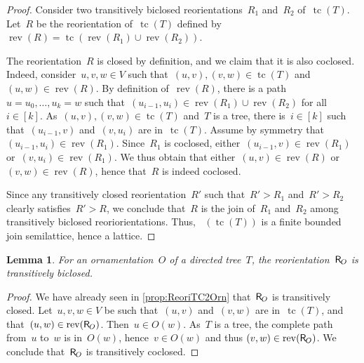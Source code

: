 \documentclass{amsart}
\newtheorem{lemma}[theorem]{Lemma}
\theoremstyle{definition}
\renewcommand{\c}[1]{\mathcal{#1}} %
\DeclareMathOperator{\tc}{tc} %
\newcommand{\mymap}[2]{\mathsf{#1}_{\hspace{-.7pt}#2}}
\newcommand{\reori}[1]{\mymap{R}{#1}}  %
\DeclareMathOperator{\Rbi}{\c{R}^{bi}}  %
\DeclareMathOperator{\rev}{rev} %
\begin{document}
\begin{proof}
Consider two transitively biclosed reorientations~$R_1$ and~$R_2$ of~$\tc(T)$.
Let~$R$ be the reorientation of~$\tc(T)$ defined by~$\rev(R) = \tc(\rev(R_1) \cup \rev(R_2))$.

The reorientation~$R$ is closed by definition, and we claim that it is also coclosed.
Indeed, consider~$u,v,w \in V$ such that~$(u,v), (v,w) \in \tc(T)$ and~$(u,w) \in \rev(R)$.
By definition of~$\rev(R)$, there is a path~$u = u_0, \dots, u_k = w$ such that~$(u_{i-1}, u_i) \in \rev(R_1) \cup \rev(R_2)$ for all~$i \in [k]$.
As~$(u,v), (v,w) \in \tc(T)$ and~$T$ is a tree, there is~$i \in [k]$ such that~$(u_{i-1}, v)$ and~$(v, u_i)$ are in~$\tc(T)$.
Assume by symmetry that~$(u_{i-1}, u_i) \in \rev(R_1)$.
Since~$R_1$ is coclosed, either~$(u_{i-1}, v) \in \rev(R_1)$ or~$(v, u_i) \in \rev(R_1)$.
We thus obtain that either~$(u,v) \in \rev(R)$ or~$(v,w) \in \rev(R)$, hence that~$R$ is indeed coclosed.

Since any transitively closed reorientation~$R'$ such that~$R' > R_1$ and~$R' > R_2$ clearly satisfies~$R' > R$, we conclude that~$R$ is the join of~$R_1$ and~$R_2$ among transitively biclosed reoriorientations.
Thus, $\Rbi(\tc(T))$ is a finite bounded join semilattice, hence a lattice.
\end{proof}

\begin{lemma}
\label{lem:Orn2ReoriT}
For an ornamentation~$O$ of a directed tree~$T$, the reorientation~$\reori{O}$ is transitively biclosed.
\end{lemma}

\begin{proof}
We have already seen in \cref{prop:ReoriTC2Orn} that~$\reori{O}$ is transitively closed.
Let~$u, v, w \in V$ be such that~$(u,v)$ and~$(v,w)$ are in~$\tc(T)$,
and that~$(u,w) \in \rev(\reori{O})$. Then~$u \in O(w)$. As~$T$ is a tree, the complete path from~$u$ to~$w$ is in~$O(w)$, hence~$v \in O(w)$ and thus $(v,w) \in \rev(\reori{O})$.
We conclude that~$\reori{O}$ is transitively coclosed.
\end{proof}
\end{document}

